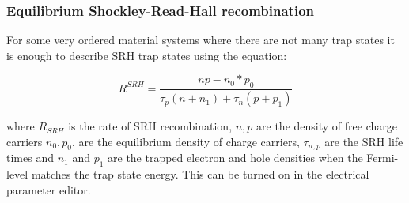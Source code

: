 \subsubsection{Equilibrium Shockley-Read-Hall recombination}

For some very ordered material systems where there are not many trap states it is enough to describe SRH trap states using the equation:

\begin{equation}
\label{eq:ss_srh}
R^{SRH}=\frac{np-n_{0}*p_{0}}{\tau_{p} (n+n_{1})+\tau_{n} (p+p_{1})}
\end{equation}

 where $R_{SRH}$ is the rate of SRH recombination, $n,p$ are the density of free charge carriers $n_0, p_0$, are the equilibrium density of charge carriers, $\tau_{n,p}$ are the SRH life times and $n_{1}$ and $p_{1}$ are the trapped electron and hole densities when the Fermi-level matches the trap state energy.  This can be turned on in the electrical parameter editor.

